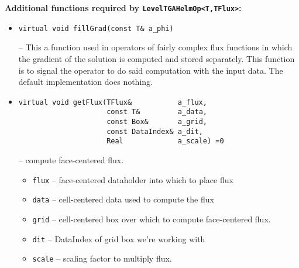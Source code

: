 {\bf Additional functions required by {\tt LevelTGAHelmOp<T,TFlux>}:}
\begin{itemize}
\item
\begin{verbatim}
virtual void fillGrad(const T& a_phi)
\end{verbatim}
-- This a function used in operators of fairly complex flux functions
in which the gradient of the solution is computed and stored
separately.  This function is to signal the operator to do said
computation with the input data. The default implementation does nothing. 

\item  
\begin{verbatim}
virtual void getFlux(TFlux&           a_flux,
                     const T&         a_data,
                     const Box&       a_grid,
                     const DataIndex& a_dit,
                     Real             a_scale) =0
\end{verbatim}
-- compute face-centered flux.
\begin{itemize}
\item {\tt flux} -- face-centered dataholder into which to place flux
\item {\tt data} -- cell-centered data used to compute the flux
\item {\tt grid} -- cell-centered box over which to compute
  face-centered flux. 
\item {\tt dit} -- DataIndex of grid box we're working with
\item {\tt scale} -- scaling factor to multiply flux. 
\end{itemize}

\end{itemize}

